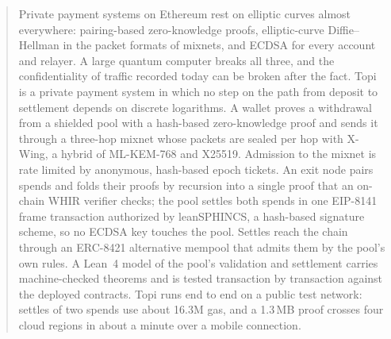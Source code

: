 \documentclass[11pt,a4paper]{article}
\begin{document}
\thispagestyle{empty}
\vspace*{9.6cm}

\begin{abstract}
\noindent Private payment systems on Ethereum rest on elliptic curves almost everywhere: pairing-based
zero-knowledge proofs, elliptic-curve Diffie--Hellman in the packet formats of mixnets, and ECDSA for
every account and relayer. A large quantum computer breaks all three, and the confidentiality of traffic
recorded today can be broken after the fact. Topi is a private payment system in which no step on the
path from deposit to settlement depends on discrete logarithms. A wallet proves a withdrawal from a
shielded pool with a hash-based zero-knowledge proof and sends it through a three-hop mixnet whose
packets are sealed per hop with X-Wing, a hybrid of ML-KEM-768 and X25519. Admission to the mixnet is
rate limited by anonymous, hash-based epoch tickets. An exit node pairs spends and folds their proofs
by recursion into a single proof that an on-chain WHIR verifier checks; the pool settles both spends in
one EIP-8141 frame transaction authorized by leanSPHINCS, a hash-based signature scheme, so no ECDSA key
touches the pool. Settles reach the chain through an ERC-8421 alternative mempool that admits them by
the pool's own rules. A Lean~4 model of the pool's validation and settlement carries machine-checked
theorems and is tested transaction by transaction against the deployed contracts. Topi runs end to end
on a public test network: settles of two spends use about 16.3M gas, and a 1.3\,MB proof crosses four
cloud regions in about a minute over a mobile connection.
\end{abstract}
\end{document}
